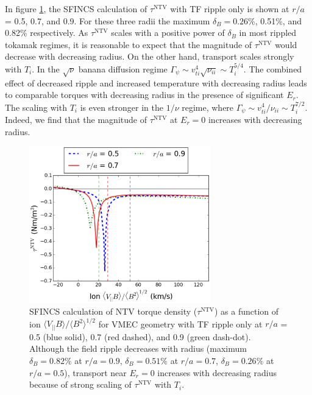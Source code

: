 \documentclass[aip, pop, preprint]{revtex4-1}
\numberwithin{figure}{section}
\numberwithin{equation}{section}
\begin{document}
In figure \ref{fig:Torque_radiusscaling}, the SFINCS calculation of $\tau^{\mathrm{NTV}}$ with TF ripple only is shown at $r/a$ = 0.5, 0.7, and 0.9. For these three radii the maximum $\delta_B = 0.26\%$,  0.51\%, and 0.82\% respectively. As $\tau^{\mathrm{NTV}}$ scales with a positive power of $\delta_B$ in most rippled tokamak regimes, it is reasonable to expect that the magnitude of $\tau^{\mathrm{NTV}}$ would decrease with decreasing radius. On the other hand, transport scales strongly with $T_i$. In the $\sqrt{\nu}$ banana diffusion regime \cite{Shaing2008} $\Gamma_{\psi} \sim v_{ti}^4 \sqrt{\nu_{ii}} \sim T_i^{5/4}$. The combined effect of decreased ripple and increased temperature with decreasing radius leads to comparable torques with decreasing radius in the presence of significant $E_r$.  The scaling with $T_i$ is even stronger in the $1/\nu$ regime,\cite{Stringer1972, Shaing2003} where $\Gamma_{\psi} \sim v_{ti}^4/\nu_{ii} \sim T_i^{7/2}$. Indeed, we find that the magnitude of $\tau^{\mathrm{NTV}}$ at $E_r = 0$ increases with decreasing radius.
 
\begin{figure}[h!]
\centering
\includegraphics[width=0.7\textwidth]{figure9.eps}
\caption{\label{fig:Torque_radiusscaling} SFINCS calculation of NTV torque density ($\tau^{\mathrm{NTV}}$) as a function of ion $\langle V_{||} B \rangle/\langle B^2 \rangle^{1/2}$ for VMEC geometry with TF ripple only at $r/a$ = 0.5 (blue solid), 0.7 (red dashed), and 0.9 (green dash-dot). Although the field ripple decreases with radius (maximum $\delta_B = 0.82\%$ at $r/a = 0.9$, $\delta_B = 0.51\%$ at $r/a = 0.7$, $\delta_B = 0.26\%$ at $r/a = 0.5$), transport near $E_r = 0$ increases with decreasing radius because of strong scaling of $\tau^{\mathrm{NTV}}$ with $T_i$.\cite{Stringer1972,Shaing2003}}
\end{figure}
\end{document}
